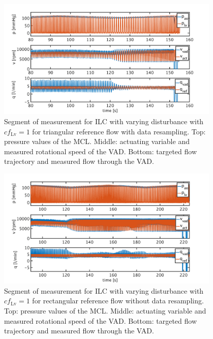 \begin{figure}[ht!]
  \centering
  \includegraphics[width=0.95\textwidth]{images/chapt_5/ILC/ilc_var_dist_fix_triang.pdf}
  \caption[Segment of measurement for ILC with varying disturbance with $cf_{\mathrm{Lv}}=1$ for triangular reference flow with data resampling]{Segment of measurement for ILC with varying disturbance with $cf_{\mathrm{Lv}}=1$ for triangular reference flow with data resampling. Top:  pressure values of the MCL. Middle: actuating variable and measured rotational speed of the VAD. Bottom: targeted flow trajectory and measured flow through the VAD.}
   \label{fig:anh_12}
\end{figure}

\begin{figure}[ht!]
  \centering
  \includegraphics[width=0.95\textwidth]{images/chapt_5/ILC/ilc_var_dist_unfix_rect.pdf}
  \caption[Segment of measurement for ILC with varying disturbance with $cf_{\mathrm{Lv}}=1$ for rectangular reference flow without data resampling]{Segment of measurement for ILC with varying disturbance with $cf_{\mathrm{Lv}}=1$ for rectangular reference flow without data resampling. Top:  pressure values of the MCL. Middle: actuating variable and measured rotational speed of the VAD. Bottom: targeted flow trajectory and measured flow through the VAD.}
   \label{fig:anh_13}
\end{figure}

